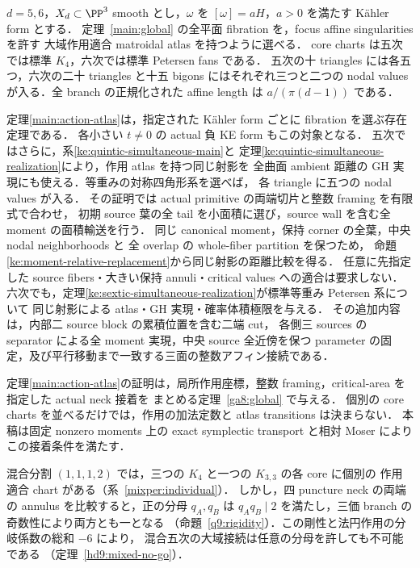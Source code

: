 \begin{theorem}\label{main:action-atlas}
$d=5,6$，$X_d\subset\PP^3$ smooth とし，$\omega$ を
$[\omega]=aH$，$a>0$ を満たす Kähler form とする．
定理~\ref{main:global} の全平面 fibration を，focus affine singularities を許す
大域作用適合 matroidal atlas を持つように選べる．
core charts は五次では標準 $K_4$，六次では標準 Petersen fans である．
五次の十 triangles には各五つ，六次の二十 triangles と十五 bigons にはそれぞれ三つと二つの
nodal values が入る．全 branch の正規化された affine length は $a/(\pi(d-1))$ である．
\end{theorem}

\begin{remark}\label{main:atlas-ke-scope}
定理\ref{main:action-atlas}は，指定された Kähler form ごとに fibration を選ぶ存在定理である．
各小さい $t\ne0$ の actual 負 KE form もこの対象となる．
五次ではさらに，系\ref{ke:quintic-simultaneous-main}と
定理\ref{ke:quintic-simultaneous-realization}により，作用 atlas を持つ同じ射影を
全曲面 ambient 距離の GH 実現にも使える．等重みの対称四角形系を選べば，
各 triangle に五つの nodal values が入る．
その証明では actual primitive の両端切片と整数 framing を有限式で合わせ，
初期 source 葉の全 tail を小面積に選び，source wall を含む全 moment の面積輸送を行う．
同じ canonical moment，保持 corner の全葉，中央 nodal neighborhoods と
全 overlap の whole-fiber partition を保つため，
命題\ref{ke:moment-relative-replacement}から同じ射影の距離比較を得る．
任意に先指定した source fibers・大きい保持 annuli・critical values への適合は要求しない．
六次でも，定理\ref{ke:sextic-simultaneous-realization}が標準等重み Petersen 系について
同じ射影による atlas・GH 実現・確率体積極限を与える．
その追加内容は，内部二 source block の累積位置を含む二端 cut，
各側三 sources の separator による全 moment 実現，中央 source 全近傍を保つ
parameter の固定，及び平行移動まで一致する三面の整数アフィン接続である．
\end{remark}

定理\ref{main:action-atlas}の証明は，局所作用座標，整数 framing，critical-area を指定した actual neck 接着を
まとめる定理~\ref{ga8:global} で与える．
個別の core charts を並べるだけでは，作用の加法定数と atlas transitions は決まらない．
本稿は固定 nonzero moments 上の exact symplectic transport と相対 Moser により
この接着条件を満たす．

混合分割 $(1,1,1,2)$ では，三つの $K_4$ と一つの $K_{3,3}$ の各 core に個別の
作用適合 chart がある（系~\ref{mixper:individual}）．
しかし，四 puncture neck の両端の annulus を比較すると，正の分母 $q_A,q_B$ は
$q_Aq_B\mid2$ を満たし，三価 branch の奇数性により両方とも一となる
（命題~\ref{q9:rigidity}）．この剛性と法円作用の分岐係数の総和 $-6$ により，
混合五次の大域接続は任意の分母を許しても不可能である
（定理~\ref{hd9:mixed-no-go}）．

